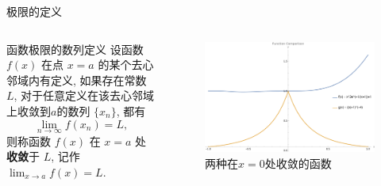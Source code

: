 \documentclass[
10pt,  
aspectratio=43,  
]{beamer}
\begin{document}
\begin{frame}[c]{极限的定义}
	\begin{columns}[onlytextwidth]
		
		\begin{block}{函数极限的数列定义}
			设函数 $f(x)$ 在点 $x=a$ 的某个去心邻域内有定义,  如果存在常数 $L$,  对于任意定义在该去心邻域上收敛到$a$的数列 $\{x_n\}$,  都有 
			\begin{equation*}
				\lim_{n\to\infty} f(x_n) = L,  
			\end{equation*}
			则称函数 $f(x)$ 在 $x=a$ 处\textbf{收敛}于 $L$,  记作 $\lim_{x \to a} f(x) = L$.
		\end{block}
		
		
		\begin{figure}
			\centering
			\includegraphics[width=0.9\linewidth]{convergent function1.png}
			\caption{两种在$x=0$处收敛的函数}
			
		\end{figure}
	\end{columns}
\end{frame}	
\end{document}
